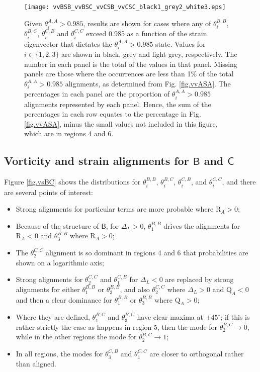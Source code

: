 \documentclass[preprint,amssymb,amsmath,aip,cha]{revtex4-1}
\begin{document}
\begin{figure*}
  \texttt{[image: vvBSB\_vvBSC\_vvCSB\_vvCSC\_black1\_grey2\_white3.eps]}
\caption{Given $\theta^{A,A}_{i} > 0.985$, results are shown for cases where any of $\theta^{B,B}_{i}$, $\theta^{B,C}_{i}$, $\theta^{C,B}_{i}$ and $\theta^{C,C}_{i}$ exceed 0.985 as a function of the strain eigenvector that dictates the $\theta^{A,A}_{i} > 0.985$ state. Values for $i \in \{1, 2, 3\}$ are shown in black, grey and light grey, respectively. The number in each panel is the total of the values in that panel. Missing panels are those where the occurrences are less than 1\% of the total $\theta^{A,A}_{i} > 0.985$ alignments, as determined from Fig. \ref{fig.vvASA}. The percentages in each panel are the proportion of $\theta^{A,A}_{i} > 0.985$ alignments represented by each panel. Hence, the sum of the percentages in each row equates to the percentage in Fig. \ref{fig.vvASA}, minus the small values not included in this figure, which are in regions 4 and 6.
}
\label{fig.vBCSBC_vvASA}   
\end{figure*}

\subsection{Vorticity and strain alignments for $\mathsf{B}$ and $\mathsf{C}$}
Figure \ref{fig.vsBC} shows the distributions for $\theta_{i}^{B,B}$, $\theta_{i}^{B,C}$, $\theta_{i}^{C,B}$, and $\theta_{i}^{C,C}$, and there are several points of interest:
\begin{itemize}
\item Strong alignments for particular terms are more probable where $\mbox{R}_{A} > 0$;
\item Because of the structure of $\mathsf{B}$, for $\Delta_{L} > 0$, $\theta^{B,B}_{1}$ drives the alignments for $\mbox{R}_{A} < 0$ and $\theta^{B,B}_{3}$ where $\mbox{R}_{A} > 0$;
\item The $\theta^{C,C}_{2}$ alignment is so dominant in regions 4 and 6 that probabilities are shown on a logarithmic axis;
\item Strong alignments for $\theta^{C,C}_{2}$ and $\theta^{C,B}_{1}$ for $\Delta_{L} < 0$ are replaced by strong alignments for either $\theta^{B,B}_{1}$ or $\theta^{B,B}_{3}$, and also $\theta^{C,C}_{2}$ where $\Delta_{L} > 0$ and $\mbox{Q}_{A} < 0$ and then a clear dominance for $\theta^{B,B}_{1}$ or $\theta^{B,B}_{3}$ where $\mbox{Q}_{A} > 0$;
\item Where they are defined, $\theta^{B,C}_{1}$ and $\theta^{B,C}_{3}$ have clear maxima at $\pm 45^{\circ}$; if this is rather strictly the case as happens in region 5, then the mode for $\theta^{B,C}_{2} \to 0$, while in the other regions the mode for $\theta^{B,C}_{2} \to 1$;
\item In all regions, the modes for $\theta^{C,B}_{3}$ and $\theta^{C,C}_{1}$ are closer to orthogonal rather than aligned.
\end{itemize}
\end{document}

